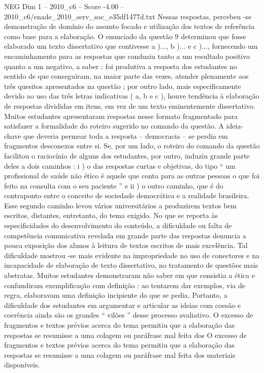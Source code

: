 \begin{textsample}{NEG Dim 1 – 2010\_c6 – Score -4.00 – 2010\_c6/enade\_2010\_serv\_soc\_e35df1477d.txt}
Nessas respostas, percebeu -se demonstração de domínio do assunto focado e utilização dos textos de referência como base para a elaboração.
O enunciado da questão 9 determinou que fosse elaborado um texto dissertativo que contivesse a )..., b )... e c )..., fornecendo um encaminhamento para as respostas que conduziu tanto a um resultado positivo quanto a um negativo, a saber : foi produtiva a resposta dos estudantes no sentido de que conseguiram, na maior parte das vezes, atender plenamente aos três quesitos apresentados na questão ; por outro lado, mais especificamente devido ao uso das três letras indicativas ( a, b e c ), houve tendência à elaboração de respostas divididas em itens, em vez de um texto eminentemente dissertativo.
Muitos estudantes apresentaram respostas nesse formato fragmentado para satisfazer a formalidade do roteiro sugerido no comando da questão.
A ideia-chave que deveria permear toda a resposta – democracia – se perdia em fragmentos desconexos entre si.
Se, por um lado, o roteiro do comando da questão facilitou o raciocínio de alguns dos estudantes, por outro, induziu grande parte deles a dois caminhos : i ) o das respostas curtas e objetivas, do tipo “ um profissional de saúde não ético é aquele que conta para as outras pessoas o que foi feito na consulta com o seu paciente ” e ii ) o outro caminho, que é do contraponto entre o conceito de sociedade democrática e a realidade brasileira.
Esse segundo caminho levou vários universitários a produzirem textos bem escritos, distantes, entretanto, do tema exigido.
No que se reporta às especificidades do desenvolvimento do conteúdo, a dificuldade ou falta de competência comunicativa revelada em grande parte das respostas denuncia a pouca exposição dos alunos à leitura de textos escritos de mais excelência.
Tal dificuldade mostrou -se mais evidente na impropriedade no uso de conectores e na incapacidade de elaboração de texto dissertativo, no tratamento de questões mais abstratas.
Muitos estudantes demonstraram não saber em que consistia a ética e confundiram exemplificação com definição : ao tentarem dar exemplos, via de regra, elaboravam uma definição incipiente do que se pedia.
Portanto, a dificuldade dos estudantes em argumentar e articular as ideias com coesão e coerência ainda são os grandes “ vilões ” desse processo avaliativo.
O excesso de fragmentos e textos prévios acerca do tema permitiu que a elaboração das respostas se resumisse a uma colagem ou paráfrase mal feita dos O excesso de fragmentos e textos prévios acerca do tema permitiu que a elaboração das respostas se resumisse a uma colagem ou paráfrase mal feita dos materiais disponíveis.

\end{textsample}
